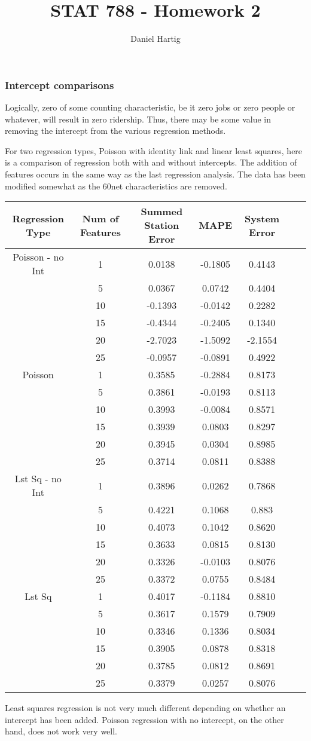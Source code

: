 \documentclass{article}
\title{STAT 788 - Homework 2}
\author{Daniel Hartig}
\begin{document}
\subsubsection*{Intercept comparisons}

Logically, zero of some counting characteristic, be it zero jobs or zero people or whatever, will result in zero ridership. Thus, there may be some value in removing the intercept from the various regression methods.

For two regression types, Poisson with identity link and linear least squares, here is a comparison of regression both with and without intercepts. The addition of features occurs in the same way as the last regression analysis. The data has been modified somewhat as the 60net characteristics are removed.

\begin{center}
\begin{tabular}{ c c c c c c c }
\hline
Regression Type&Num of Features&Summed Station Error&MAPE&System Error \\
\hline
Poisson - no Int&1&0.0138&-0.1805&0.4143\\
&5&0.0367&0.0742&0.4404\\
&10&-0.1393&-0.0142&0.2282\\
&15&-0.4344&-0.2405&0.1340\\
&20&-2.7023&-1.5092&-2.1554\\
&25&-0.0957&-0.0891&0.4922\\
\hline
Poisson&1&0.3585&-0.2884&0.8173\\
&5&0.3861&-0.0193&0.8113\\
&10&0.3993&-0.0084&0.8571\\
&15&0.3939&0.0803&0.8297\\
&20&0.3945&0.0304&0.8985\\
&25&0.3714&0.0811&0.8388\\
\hline
Lst Sq - no Int&1&0.3896&0.0262&0.7868\\
&5&0.4221&0.1068&0.883\\
&10&0.4073&0.1042&0.8620\\
&15&0.3633&0.0815&0.8130\\
&20&0.3326&-0.0103&0.8076\\
&25&0.3372&0.0755&0.8484\\
\hline
Lst Sq&1&0.4017&-0.1184&0.8810\\
&5&0.3617&0.1579&0.7909\\
&10&0.3346&0.1336&0.8034\\
&15&0.3905&0.0878&0.8318\\
&20&0.3785&0.0812&0.8691\\
&25&0.3379&0.0257&0.8076\\
\end{tabular}
\end{center}

Least squares regression is not very much different depending on whether an intercept has been added. Poisson regression with no intercept, on the other hand, does not work very well. 
\end{document}
